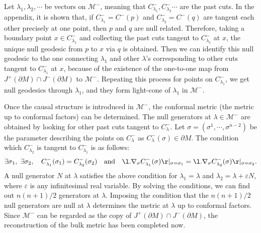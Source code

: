 \documentclass[12pt]{article}
\begin{document}
Let $\lambda_1,\lambda_2,\cdots$ be vectors on $\mathcal M^-$, 
meaning that $C^-_{\lambda_1},C^-_{\lambda_2}\cdots$ are the past cuts.
In the appendix, it is shown that, if $C^-_{\lambda_1} = C^-(p)$ and $C_{\lambda_2}^- = C^-(q)$ are tangent each other 
precisely at one point, then $p$ and $q$ are null related.
Therefore, taking a boundary point $x \in C^-_{\lambda_1}$ and collecting the past cuts tangent to $C^-_{\lambda_1}$ at $x$,
 the unique null geodesic from $p$ to $x$ via $q$ is obtained.
Then we can identify this null geodesic to the one connecting $\lambda_1$ and other $\lambda$'s corresponding to 
other cuts tangent to $C^-_{\lambda_1}$ at $x$, because of the existence of the one-to-one map from 
$J^+(\partial M)\cap J^-(\partial M)$ to $\mathcal M^-$.
Repeating this process for points on $C^-_{\lambda_1}$, we get null geodesics through $\lambda_1$, 
and they form light-cone of $\lambda_1$ in $\mathcal M^-$.

Once the causal structure is introduced in $\mathcal M^-$, the conformal metric (the metric up to conformal factors) 
can be determined.
The null generators at $\lambda\in \mathcal M^-$ are obtained by looking for other past cuts tangent to $C^-_{\lambda}$.
Let $\sigma = (\sigma^1,\cdots,\sigma^{n-2})$ be the parameter describing the points on 
$C^-_{\lambda}$ as $C^-_{\lambda}(\sigma) \in \partial M$.
The condition which $C^-_{\lambda_2}$ is tangent to $C^-_{\lambda_1}$ is as follows:
\begin{align}
	\exists\sigma_1,~\exists\sigma_2,\quad C^-_{\lambda_1}(\sigma_1) = C^-_{\lambda_2}(\sigma_2)\quad\mathrm{and}\quad \l.\nabla_{\sigma} C^-_{\lambda_1}(\sigma)\r|_{\sigma = \sigma_1} = \l.\nabla_{\sigma} C^-_{\lambda_2}(\sigma) \r|_{\sigma = \sigma_2}.
\end{align}
A null generator $N$ at $\lambda$ satisfies the above condition for $\lambda_1 = \lambda$ and 
$\lambda_2 = \lambda + \varepsilon N$, where $\varepsilon$ is any infinitesimal real variable.
By solving the conditions, we can find out $n(n+1)/2$ generators at $\lambda$.
Imposing the condition that the $n(n+1)/2$ null generators are null at $\lambda$ determines the metric at $\lambda$ up to
 conformal factors.
Since $\mathcal M^-$ can be regarded as the copy of $J^+(\partial M)\cap J^-(\partial M)$, the reconstruction of
 the bulk metric has been completed now.


 

\end{document}
